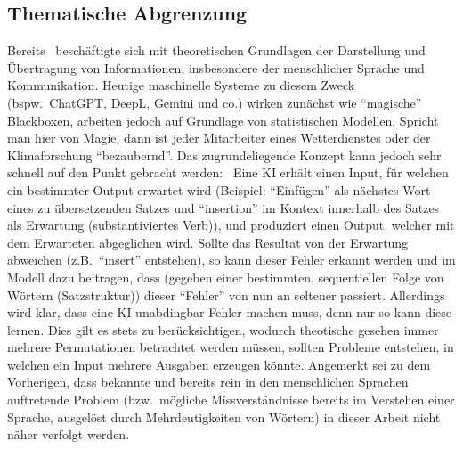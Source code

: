 \subsection{Thematische Abgrenzung}\label{einleitung:motivation}
Bereits~\cite{bellSystemTechnicalJournal:claudeShannon1948:mathematicalTheoryOfCommunication} beschäftigte sich mit theoretischen Grundlagen der Darstellung und Übertragung von Informationen, insbesondere der menschlicher Sprache und Kommunikation. Heutige maschinelle Systeme zu diesem Zweck (bspw.\ ChatGPT, DeepL, Gemini und co.) wirken zunächst wie \enquote{magische} Blackboxen, arbeiten jedoch auf Grundlage von statistischen Modellen. Spricht man hier von Magie, dann ist jeder Mitarbeiter eines Wetterdienstes oder der Klimaforschung \enquote{bezaubernd}. Das zugrundeliegende Konzept kann jedoch sehr schnell auf den Punkt gebracht werden:\ 
Eine KI erhält einen Input, für welchen ein bestimmter Output erwartet wird (Beispiel: \enquote{Einfügen} als nächstes Wort eines zu übersetzenden Satzes und \enquote{insertion} im Kontext innerhalb des Satzes als Erwartung (substantiviertes Verb)), und produziert einen Output, welcher mit dem Erwarteten abgeglichen wird. Sollte das Resultat von der Erwartung abweichen (z.B.\ \enquote{insert} entstehen), so kann dieser Fehler erkannt werden und im Modell dazu beitragen, dass (gegeben einer bestimmten, sequentiellen Folge von Wörtern (Satzstruktur)) dieser \enquote{Fehler} von nun an seltener passiert. Allerdings wird klar, dass eine KI unabdingbar Fehler machen muss, denn nur so kann diese lernen. Dies gilt es stets zu berücksichtigen, wodurch theotische gesehen immer mehrere Permutationen betrachtet werden müssen, sollten Probleme entstehen, in welchen ein Input mehrere Ausgaben erzeugen könnte. Angemerkt sei zu dem Vorherigen, dass bekannte und bereits rein in den menschlichen Sprachen auftretende Problem (bzw.\ mögliche Missverständnisse bereits im Verstehen einer Sprache, ausgelöst durch Mehrdeutigkeiten von Wörtern) in dieser Arbeit nicht näher verfolgt werden.

